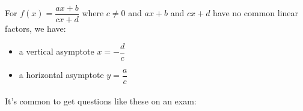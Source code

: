 \documentclass[12pt, a4paper, titlepage, twoside]{article}
\begin{document}
	\begin{kp}
		For $f(x) = \dfrac{ax+b}{cx+d}$ where $c \neq 0$ and $ax+b$ and $cx+d$ have no common linear factors, we have:
		\begin{itemize}
			\item a vertical asymptote $x = -\dfrac{d}{c}$
			\item a horizontal asymptote $y = \dfrac{a}{c}$
		\end{itemize}
	\end{kp}
	
	\paragraph{}
	It's common to get questions like these on an exam:\\
	
\end{document}
